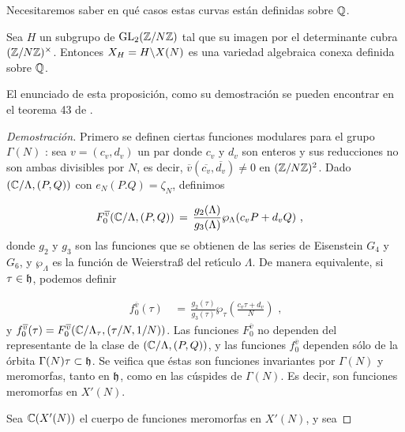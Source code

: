 Necesitaremos saber en qu\'{e} casos estas curvas est\'{a}n definidas sobre
$\bb{Q}$.

\begin{propoDefinidasSobreQ}\label{thm:propoDefinidasSobreQ}
Sea $H$ un subgrupo de $\GL{2}(\bb{Z}/N\bb{Z})$ tal que su imagen por el
determinante cubra $(\bb{Z}/N\bb{Z})^{\times}$. Entonces $X_{H}=H\backs X(N)$ es
una variedad algebraica conexa definida sobre $\bb{Q}$.
\end{propoDefinidasSobreQ}
El enunciado de esta proposici\'{o}n, como su demostraci\'{o}n se pueden encontrar
en el teorema 43 de \cite{booher}.

\begin{proof}[Demostraci\'{o}n]
Primero se definen ciertas funciones modulares para el grupo $\Gamma(N)$
\cite{diamondShurman}: sea $v=(c_{v},d_{v})$ un par donde $c_{v}$ y $d_{v}$ son
enteros y sus reducciones no son ambas divisibles por $N$, es decir,
$\overline{v}(\overline{c_{v}},\overline{d_{v}})\not =0$ en $(\bb{Z}/N\bb{Z})^{2}$.
Dado $(\bb{C}/\Lambda,(P,Q))$ con $e_{N}(P.Q)=\zeta_{N}$, definimos

\begin{align*}
F_{0}^{\overline{v}}(\bb{C}/\Lambda,(P,Q)) & \,=\,
\frac{g_{2}(\Lambda)}{g_{3}(\Lambda)}\wp_{\Lambda}(c_{v}P+d_{v}Q)\text{ ,}
\end{align*}
donde $g_{2}$ y $g_{3}$ son las funciones que se obtienen de las series de
Eisenstein $G_{4}$ y $G_{6}$, y $\wp_{\Lambda}$ es la funci\'{o}n de
Weierstra{\ss} del ret\'{\i}culo $\Lambda$. De manera equivalente, si
$\tau\in\frak{h}$, podemos definir

\begin{align*}
f_{0}^{\overline{v}}(\tau) & \,=\,
\frac{g_{2}(\tau)}{g_{3}(\tau)}\wp_{\tau}(\frac{c_{v}\tau+d_{v}}{N})
\text{ ,}
\end{align*}
y
\begin{math}
f_{0}^{\overline{v}}(\tau)=
F_{0}^{\overline{v}}(\bb{C}/\Lambda_{\tau},(\tau/N,1/N))
\end{math}.
Las funciones $F_{0}^{\overline{v}}$ no dependen del representante de la clase de
$(\bb{C}/\Lambda,(P,Q))$, y las funciones $f_{0}^{\overline{v}}$ dependen s\'{o}lo
de la \'{o}rbita $\Gamma(N)\tau\subset\frak{h}$. Se veifica que \'{e}stas
son funciones invariantes por $\Gamma(N)$ y meromorfas, tanto en $\frak{h}$, como
en las c\'{u}spides de $\Gamma(N)$. Es decir, son funciones meromorfas en $X'(N)$.

Sea $\bb{C}(X'(N))$ el cuerpo de funciones meromorfas en $X'(N)$, y sea


\end{proof}
